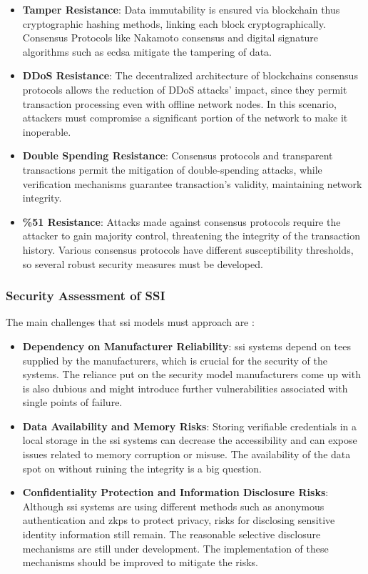 \begin{itemize}
  \item \textbf{Tamper Resistance}: Data immutability is ensured via blockchain thus cryptographic hashing methods, linking each block cryptographically. Consensus 
  Protocols like Nakamoto consensus and digital signature algorithms such as \gls{ecdsa} mitigate the tampering of data.
  \item \textbf{DDoS Resistance}: The decentralized architecture of blockchains consensus protocols allows the reduction of DDoS attacks' impact, since they permit 
  transaction processing even with offline network nodes. In this scenario, attackers must compromise a significant portion of the network to make it inoperable.
  \item \textbf{Double Spending Resistance}: Consensus protocols and transparent transactions permit the mitigation of double-spending attacks, while verification 
  mechanisms guarantee transaction's validity, maintaining network integrity.
  \item \textbf{\%51 Resistance}: Attacks made against consensus protocols require the attacker to gain majority control, threatening the integrity of the transaction 
  history. Various consensus protocols have different susceptibility thresholds, so several robust security measures must be developed.
\end{itemize}

\subsubsection{Security Assessment of SSI}

The main challenges that \gls{ssi} models must approach are \cite{CyberSecurity}:

\begin{itemize}
  \item \textbf{Dependency on Manufacturer Reliability}: \gls{ssi} systems depend on \gls{tee}s supplied by the manufacturers, which is crucial for 
  the security of the systems. The reliance put on the security model manufacturers come up with is also dubious and might introduce further vulnerabilities associated with 
  single points of failure.
  \item \textbf{Data Availability and Memory Risks}: Storing verifiable credentials in a local storage in the \gls{ssi} systems can decrease the accessibility and can expose 
  issues related to memory corruption or misuse. The availability of the data spot on without ruining the integrity is a big question.
  \item \textbf{Confidentiality Protection and Information Disclosure Risks}: Although \gls{ssi} systems are using different methods such as anonymous authentication and 
  \gls{zkp}s to protect privacy, risks for disclosing sensitive identity information still remain. The reasonable selective disclosure mechanisms are 
  still under development. The implementation of these mechanisms should be improved to mitigate the risks.
\end{itemize}

